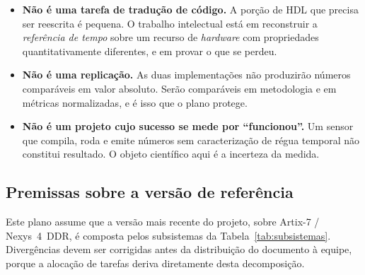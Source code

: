 \documentclass[11pt,a4paper]{article}
\begin{document}
\begin{itemize}
  \item \textbf{Não é uma tarefa de tradução de código.} A porção de HDL que
        precisa ser reescrita é pequena. O trabalho intelectual está em reconstruir
        a \emph{referência de tempo} sobre um recurso de \emph{hardware} com
        propriedades quantitativamente diferentes, e em provar o que se perdeu.
  \item \textbf{Não é uma replicação.} As duas implementações não produzirão
        números comparáveis em valor absoluto. Serão comparáveis em metodologia
        e em métricas normalizadas, e é isso que o plano protege.
  \item \textbf{Não é um projeto cujo sucesso se mede por ``funcionou''.}
        Um sensor que compila, roda e emite números sem caracterização de régua
        temporal não constitui resultado. O objeto científico aqui é a incerteza
        da medida.
\end{itemize}

\subsection{Premissas sobre a versão de referência}

Este plano assume que a versão mais recente do projeto, sobre Artix-7 / Nexys~4~DDR,
é composta pelos subsistemas da Tabela~\ref{tab:subsistemas}. Divergências devem ser
corrigidas antes da distribuição do documento à equipe, porque a alocação de tarefas
deriva diretamente desta decomposição.
\end{document}
